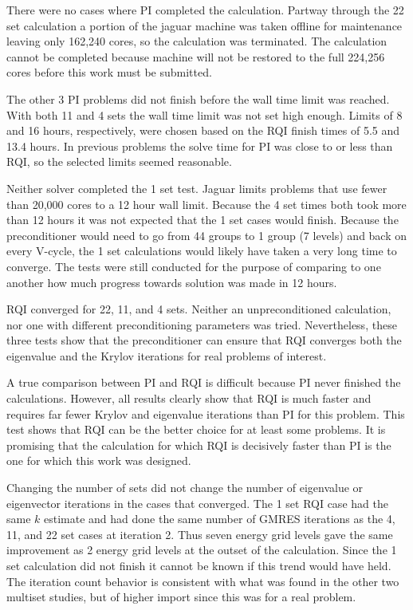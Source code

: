 There were no cases where PI completed the calculation. Partway through the 22 set calculation a portion of the jaguar machine was taken offline for maintenance leaving only 162,240 cores, so the calculation was terminated. The calculation cannot be completed because machine will not be restored to the full 224,256 cores before this work must be submitted. 

The other 3 PI problems did not finish before the wall time limit was reached. With both 11 and 4 sets the wall time limit was not set high enough. Limits of 8 and 16 hours, respectively, were chosen based on the RQI finish times of 5.5 and 13.4 hours. In previous problems the solve time for PI was close to or less than RQI, so the selected limits seemed reasonable. 

Neither solver completed the 1 set test. Jaguar limits problems that use fewer than 20,000 cores to a 12 hour wall limit. Because the 4 set times both took more than 12 hours it was not expected that the 1 set cases would finish. Because the preconditioner would need to go from 44 groups to 1 group (7 levels) and back on every V-cycle, the 1 set calculations would likely have taken a very long time to converge. The tests were still conducted for the purpose of comparing to one another how much progress towards solution was made in 12 hours. 

RQI converged for 22, 11, and 4 sets. Neither an unpreconditioned calculation, nor one with different preconditioning parameters was tried. Nevertheless, these three tests show that the preconditioner can ensure that RQI converges both the eigenvalue and the Krylov iterations for real problems of interest. 

A true comparison between PI and RQI is difficult because PI never finished the calculations. However, all results clearly show that RQI is much faster and requires far fewer Krylov and eigenvalue iterations than PI for this problem. This test shows that RQI can be the better choice for at least some problems. It is promising that the calculation for which RQI is decisively faster than PI is the one for which this work was designed. 

Changing the number of sets did not change the number of eigenvalue or eigenvector iterations in the cases that converged. The 1 set RQI case had the same $k$ estimate and had done the same number of GMRES iterations as the 4, 11, and 22 set cases at iteration 2. Thus seven energy grid levels gave the same improvement as 2 energy grid levels at the outset of the calculation. Since the 1 set calculation did not finish it cannot be known if this trend would have held. The iteration count behavior is consistent with what was found in the other two multiset studies, but of higher import since this was for a real problem.


